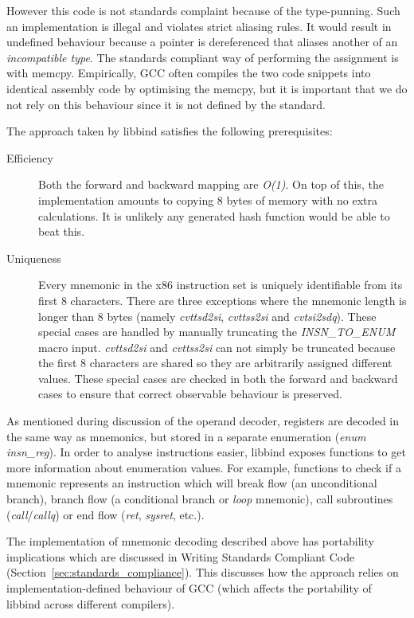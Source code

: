 However this code is not standards complaint because of the type-punning. Such an implementation is illegal and violates strict aliasing rules. It would result in undefined behaviour because a pointer is dereferenced that aliases another of an \emph{incompatible type}. The standards compliant way of performing the assignment is with memcpy. Empirically, GCC often compiles the two code snippets into identical assembly code by optimising the memcpy, but it is important that we do not rely on this behaviour since it is not defined by the standard.

The approach taken by libbind satisfies the following prerequisites:

\begin{description}
\item [Efficiency] Both the forward and backward mapping are \emph{O(1)}. On top of this, the implementation amounts to copying 8 bytes of memory with no extra calculations. It is unlikely any generated hash function would be able to beat this.
\item [Uniqueness] Every mnemonic in the x86 instruction set is uniquely identifiable from its first 8 characters. There are three exceptions where the mnemonic length is longer than 8 bytes (namely \emph{cvttsd2si}, \emph{cvttss2si} and \emph{cvtsi2sdq}). These special cases are handled by manually truncating the \emph{INSN\_TO\_ENUM} macro input.  \emph{cvttsd2si} and \emph{cvttss2si} can not simply be truncated because the first 8 characters are shared so they are arbitrarily assigned different values. These special cases are checked in both the forward and backward cases to ensure that correct observable behaviour is preserved.
\end{description}

As mentioned during discussion of the operand decoder, registers are decoded in the same way as mnemonics, but stored in a separate enumeration (\emph{enum insn\_reg}). In order to analyse instructions easier, libbind exposes functions to get more information about enumeration values. For example, functions to check if a mnemonic represents an instruction which will break flow (an unconditional branch), branch flow (a conditional branch or \emph{loop} mnemonic), call subroutines (\emph{call}/\emph{callq}) or end flow (\emph{ret}, \emph{sysret}, etc.).

The implementation of mnemonic decoding described above has portability implications which are discussed in Writing Standards Compliant Code (Section~\ref{sec:standards_compliance}). This discusses how the approach relies on implementation-defined behaviour of GCC (which affects the portability of libbind across different compilers).

